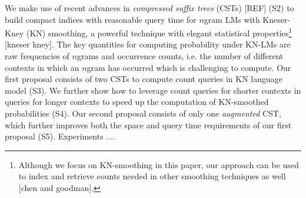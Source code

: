 %
%
%
%
 
We make use of recent advances in 
\emph{compressed suffix trees} (CSTs) [REF] (S2) to build compact indices  
with reasonable query time for $n$gram LMs with Kneser-Kney (KN) smoothing,  
a powerful technique with elegant statistical properties\footnote{Although
we focus on KN-smoothing in this paper, our approach can be used to index and retrieve
counts needed in other smoothing techniques as well [chen and goodman].}  [kneser kney].
%
The key quantities for computing probability under KN-LMs
are raw frequencies of $n$grams 
and occurrence counts, i.e. the number of different contexts in which an $n$gram has 
occurred which is challenging to compute.
%
%
Our first proposal consists of two CSTs to compute count queries 
in KN language model (S3). 
% 
We further show how to leverage count queries for shorter contexts in queries for 
longer contexts to speed up the computation of KN-smoothed probabilities (S4).
%
Our second proposal consists of only one \emph{augmented} CST, which 
further improves both the space and query time requirements of our first proposal (S5). 
% 
Experiments ....


